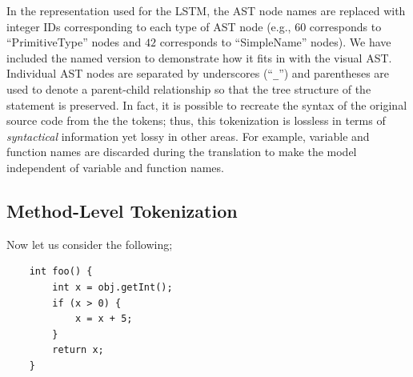 \documentclass{article}
\begin{document}

In the representation used for the LSTM, the AST node names are replaced with
integer IDs corresponding to each type of AST node
(e.g., $60$ corresponds to ``PrimitiveType'' nodes and $42$ corresponds to
``SimpleName'' nodes).
We have included the named version to demonstrate
how it fits in with the visual AST.  Individual AST nodes are
separated by underscores (``\texttt{\_}'') and parentheses are used
to denote a parent-child relationship so that the tree structure of
the statement is preserved. In fact, it is possible  to recreate the
syntax of the original source  code from the the tokens; thus, this 
tokenization is lossless in terms of  \textit{syntactical} information 
yet lossy in other areas. For example, variable and function names are
discarded during the translation to make the model independent of
variable and function names.


\subsection{Method-Level Tokenization}

Now let us consider the following;

\begin{verbatim}
    int foo() {
        int x = obj.getInt();
        if (x > 0) {
            x = x + 5;
        }
        return x;
    }
\end{verbatim}
\end{document}
